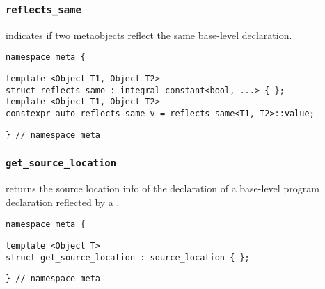 

\subsubsection{\texttt{reflects\_same}}

indicates if two metaobjects reflect the same base-level declaration.

\begin{verbatim}
namespace meta {
\end{verbatim}
\begin{verbatim}
template <Object T1, Object T2>
struct reflects_same : integral_constant<bool, ...> { };
template <Object T1, Object T2>
constexpr auto reflects_same_v = reflects_same<T1, T2>::value;
\end{verbatim}
\begin{verbatim}
} // namespace meta
\end{verbatim}



\subsubsection{\texttt{get\_source\_location}}

returns the source location info of the declaration of a base-level program declaration reflected by a .

\begin{verbatim}
namespace meta {
\end{verbatim}
\begin{verbatim}
template <Object T>
struct get_source_location : source_location { };

\end{verbatim}
\begin{verbatim}
} // namespace meta
\end{verbatim}

